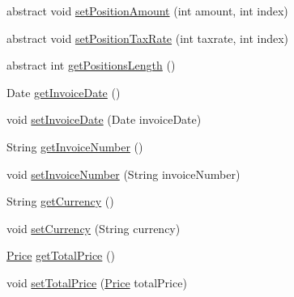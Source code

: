 \begin{DoxyCompactItemize}
\item 
abstract void \hyperlink{class_reduced_invoice_1_1_a_invoice_aef6af27bf12024c16e8e5890243825eb}{set\+Position\+Amount} (int amount, int index)
\item 
abstract void \hyperlink{class_reduced_invoice_1_1_a_invoice_a5919a1c5d917fc62d654441f582f470e}{set\+Position\+Tax\+Rate} (int taxrate, int index)
\item 
abstract int \hyperlink{class_reduced_invoice_1_1_a_invoice_a109ff7a484de183356ebe38737556f11}{get\+Positions\+Length} ()
\item 
Date \hyperlink{class_reduced_invoice_1_1_a_invoice_ac78ce56c3ae003ca87e8144546d7ec3f}{get\+Invoice\+Date} ()
\item 
void \hyperlink{class_reduced_invoice_1_1_a_invoice_adefa18f4aec87c1d4b89233baf6ce9ee}{set\+Invoice\+Date} (Date invoice\+Date)
\item 
String \hyperlink{class_reduced_invoice_1_1_a_invoice_a09231d505794762ea8f363e4689392c8}{get\+Invoice\+Number} ()
\item 
void \hyperlink{class_reduced_invoice_1_1_a_invoice_a20d784a1da556e7bb3c5538c5a6701c4}{set\+Invoice\+Number} (String invoice\+Number)
\item 
String \hyperlink{class_reduced_invoice_1_1_a_invoice_a2c0175f8fdd6c21504bdf6f8e3336cc2}{get\+Currency} ()
\item 
void \hyperlink{class_reduced_invoice_1_1_a_invoice_a83a6ba629194d28ea32c24275d0e14ba}{set\+Currency} (String currency)
\item 
\hyperlink{class_reduced_invoice_1_1_price}{Price} \hyperlink{class_reduced_invoice_1_1_a_invoice_aedc84169ce345d6f7c72b808c305c27b}{get\+Total\+Price} ()
\item 
void \hyperlink{class_reduced_invoice_1_1_a_invoice_ac5c395d78cb3bd54e8e40678bdb46bf0}{set\+Total\+Price} (\hyperlink{class_reduced_invoice_1_1_price}{Price} total\+Price)
\end{DoxyCompactItemize}
